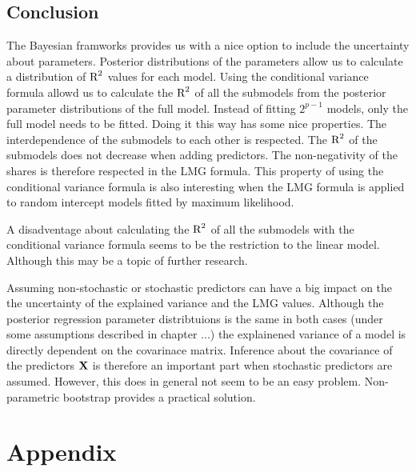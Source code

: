 \documentclass[11pt,a4paper,twoside]{book}\usepackage[]{graphicx}\usepackage[]{color}
\begin{document}
 
\section{Conclusion}

The Bayesian framworks provides us with a nice option to include the uncertainty about parameters. Posterior distributions of the parameters allow us to calculate a distribution of $\text{R}^2$ values for each model. Using  the conditional variance formula allowd us to calculate the $\text{R}^2$ of all the submodels from the posterior parameter distributions of the full model. Instead of fitting $2^
{p-1}$ models, only the full model needs to be fitted. Doing it this way has some nice properties. The interdependence of the submodels to each other is respected. The $\text{R}^2$ of the submodels does not decrease when adding predictors. The non-negativity of the shares is therefore respected in the LMG formula. This property of using the conditional variance formula is also interesting when the LMG formula is applied to random intercept models fitted by maximum likelihood. 

A disadventage about calculating the $\text{R}^2$ of all the submodels with the conditional variance formula  seems to be the restriction to the linear model. Although this may be a topic of further research.

Assuming non-stochastic or stochastic predictors can have a big impact on the the uncertainty of the explained variance and the LMG values. Although the posterior regression parameter distribtuions is the same in both cases (under some assumptions described in chapter ...) the explainened variance of a model is directly dependent on the covarinace matrix. Inference about the covariance of the predictors ${\mathbf{X}}$ is therefore an important part when stochastic predictors are assumed. However, this does in general not seem to be an easy problem. Non-parametric bootstrap provides a practical solution. 










\chapter{Appendix}
\end{document}

